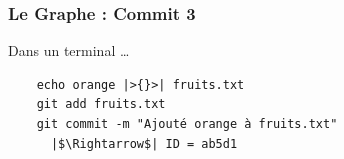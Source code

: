 \documentclass[table,tikz,12pt,svgnames]{beamer}
\begin{document}


\begin{frame}[fragile]
\frametitle{Le Graphe : Commit 3}
	\begin{figure}
		\begin{subfigure}[h]{\textwidth}
		\end{subfigure}
	\end{figure}

\begin{block}{Dans un terminal \ldots}
	\begin{verbatim}
	echo orange |>{}>| fruits.txt
	git add fruits.txt
	git commit -m "Ajouté orange à fruits.txt"
	  |$\Rightarrow$| ID = ab5d1
	\end{verbatim}
\end{block}
\end{frame}
\end{document}
